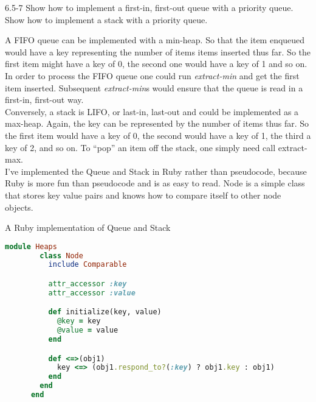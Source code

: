 

\usepackage{listings}




\homeworkheader{\classnameandsection}

\begin{problem}{6.5-7}
  Show how to implement a first-in, first-out queue with a priority queue. Show how to implement a stack with
  a priority queue.

  \begin{solution}
    A FIFO queue can be implemented with a min-heap. So that the item enqueued would have a key representing
    the number of items items inserted thus far. So the first item might have a key of 0, the second one would have a key
    of 1 and so on. \\

    In order to process the FIFO queue one could run {\sl extract-min} and get the first item inserted.
    Subsequent {\sl extract-min}s would ensure that the queue is read in a first-in, first-out way. \\

    Conversely, a stack is LIFO, or last-in, last-out and could be implemented as a max-heap.
    Again, the key can be represented by the number of items thus far. So the first item would have a key of 0, the second
    would have a key of 1, the third a key of 2, and so on. To ``pop'' an item off the stack, one simply need
    call extract-max. \\

    I've implemented the Queue and Stack in Ruby rather than pseudocode, because Ruby is more fun than pseudocode and
    is as easy to read. Node is a simple class that stores key value pairs and knows how to compare itself to other
    node objects. \\

    \centerline{A Ruby implementation of Queue and Stack}
    \begin{lstlisting}[language=Ruby]
      module Heaps
        class Node
          include Comparable

          attr_accessor :key
          attr_accessor :value

          def initialize(key, value)
            @key = key
            @value = value
          end

          def <=>(obj1)
            key <=> (obj1.respond_to?(:key) ? obj1.key : obj1)
          end
        end
      end


\end{lstlisting}
\end{solution}
\end{problem}
